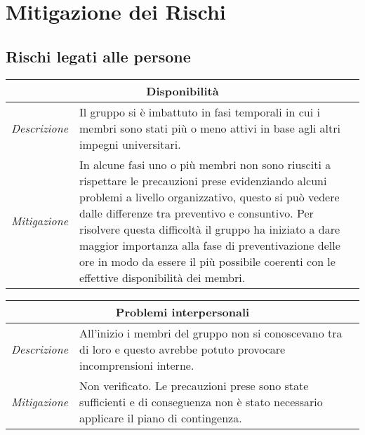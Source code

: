 \chapter{Mitigazione dei Rischi}

\section{Rischi legati alle persone}

\begin{table}[H]
    \centering
    \begin{tabular}{|p{2cm}|p{10cm}|}
    \hline
    \multicolumn{2}{|c|}{\textbf{Disponibilità}} \\ \hline
    \multicolumn{1}{|l|}{\textit{Descrizione}} & Il gruppo si è imbattuto in fasi temporali in cui i membri sono stati più o meno attivi in base agli altri impegni universitari. \\ \hline
    \multicolumn{1}{|l|}{\textit{Mitigazione}} & In alcune fasi uno o più membri non sono riusciti a rispettare le precauzioni prese evidenziando alcuni problemi a livello organizzativo, questo si può vedere dalle differenze tra preventivo e consuntivo. Per risolvere questa difficoltà il gruppo ha iniziato a dare maggior importanza alla fase di preventivazione delle ore in modo da essere il più possibile coerenti con le effettive disponibilità dei membri. \\ \hline
    \end{tabular}
\end{table}

\begin{table}[H]
    \centering
    \begin{tabular}{|p{2cm}|p{10cm}|}
    \hline
    \multicolumn{2}{|c|}{\textbf{Problemi interpersonali}} \\ \hline
    \multicolumn{1}{|l|}{\textit{Descrizione}} & All'inizio i membri del gruppo non si conoscevano tra di loro e questo avrebbe potuto provocare incomprensioni interne. \\ \hline
    \multicolumn{1}{|l|}{\textit{Mitigazione}} & Non verificato. Le precauzioni prese sono state sufficienti e di conseguenza non è stato necessario applicare il piano di contingenza. \\ \hline
    \end{tabular}
\end{table}

